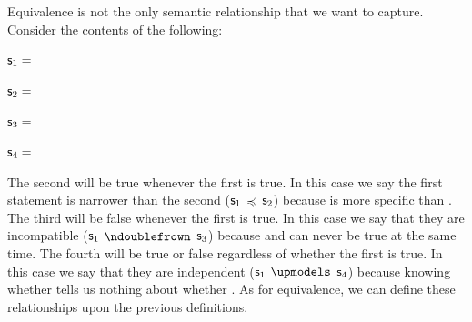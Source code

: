 \documentclass[11pt,letterpaper,fleqn]{memoir} %
\begin{document}
Equivalence is not the only semantic relationship that we want to capture. Consider the contents of the following:
\begin{description}
	\item $\mathsf{s}_1=$
	\item $\mathsf{s}_2=$
	\item $\mathsf{s}_3=$
	\item $\mathsf{s}_4=$
\end{description}
The second will be true whenever the first is true. In this case we say the first statement is narrower than the second ($\mathsf{s}_1$ $\preccurlyeq$ $\mathsf{s}_2$) because  is more specific than . The third will be false whenever the first is true. In this case we say that they are incompatible ($\mathsf{s}_1$ $\ncomp$ $\mathsf{s}_3$) because  and  can never be true at the same time. The fourth will be true or false regardless of whether the first is true. In this case we say that they are independent ($\mathsf{s}_1$ $\indep$ $\mathsf{s}_4$) because knowing whether  tells us nothing about whether . As for equivalence, we can define these relationships upon the previous definitions.
\end{document}
